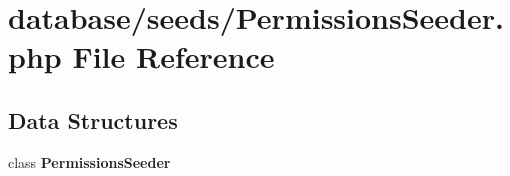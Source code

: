 \section{database/seeds/\+Permissions\+Seeder.php File Reference}
\label{_permissions_seeder_8php}
\subsection*{Data Structures}
\begin{DoxyCompactItemize}
\item 
class {\bf Permissions\+Seeder}
\end{DoxyCompactItemize}
